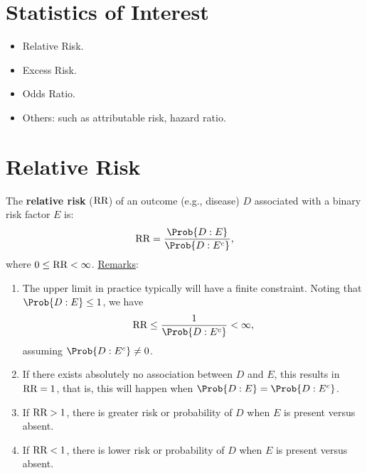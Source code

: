 \section*{Statistics of Interest}
\begin{itemize}
    \item Relative Risk.
    \item Excess Risk.
    \item Odds Ratio.
    \item Others: such as attributable risk, hazard ratio.
\end{itemize}
\section{Relative Risk}
\begin{Regular}{}
    The \textbf{relative risk} ($ \text{RR} $) of an outcome (e.g., disease)
    $ D $ associated with a binary risk factor $ E $ is:
    \[ \RR=\frac{\Prob{D\given E}}{\Prob{D\given E^c}}, \]
    where $ 0\le \text{RR}<\infty $.
    \tcblower{}
    \underline{Remarks}:
    \begin{enumerate}[(1)]
        \item The upper limit in practice typically
              will have a finite constraint. Noting that $ \Prob{D\given E}\le 1 $,
              we have
              \[ \RR\le \frac{1}{\Prob{D\given E^c}}<\infty, \]
              assuming $ \Prob{D\given E^c}\ne 0 $.
        \item If there exists absolutely no association between $ D $
              and $ E $, this results in $ \text{RR}=1 $, that is, this will happen
              when $ \Prob{D\given E}=\Prob{D\given E^c} $.
        \item If $ \text{RR}>1 $, there is greater risk or probability
              of $ D $ when $ E $ is present versus absent.
        \item If $ \text{RR}<1 $, there is lower risk or probability
              of $ D $ when $ E $ is present versus absent.
    \end{enumerate}
\end{Regular}
